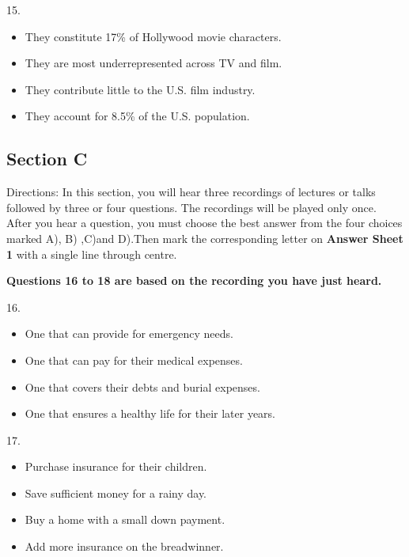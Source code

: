 \documentclass[UTF8,11pt]{ctexart}
\begin{document}
15.


\begin{itemize}[leftmargin=2em,itemsep=.2em,topsep=.4em]\item[A.] They constitute 17\% of Hollywood movie characters.
\item[B.] They are most underrepresented across TV and film.
\item[C.] They contribute little to the U.S. film industry.
\item[D.] They account for 8.5\% of the U.S. population.
\end{itemize}

\subsection*{\textbf{Section C}}


Directions: In this section, you will hear three recordings of lectures or talks followed by three or four questions. The recordings will be played only once. After you hear a question, you must choose the best answer from the four choices marked A), B) ,C)and D).Then mark the corresponding letter on\textbf{ Answer Sheet 1} with a single line through centre.


\textbf{Questions 16 to 18 are based on the recording you have just heard.}


16.


\begin{itemize}[leftmargin=2em,itemsep=.2em,topsep=.4em]\item[A.] One that can provide for emergency needs.
\item[B.] One that can pay for their medical expenses.
\item[C.] One that covers their debts and burial expenses.
\item[D.] One that ensures a healthy life for their later years.
\end{itemize}

17.


\begin{itemize}[leftmargin=2em,itemsep=.2em,topsep=.4em]\item[A.] Purchase insurance for their children.
\item[B.] Save sufficient money for a rainy day.
\item[C.] Buy a home with a small down payment.
\item[D.] Add more insurance on the breadwinner.
\end{itemize}
\end{document}
